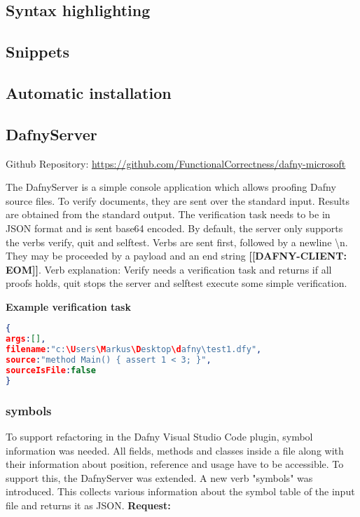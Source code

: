 \subsection{Syntax highlighting}

\subsection{Snippets}

\subsection{Automatic installation}


\subsection{DafnyServer}
Github Repository: \href{https://github.com/FunctionalCorrectness/dafny-microsoft}{https://github.com/FunctionalCorrectness/dafny-microsoft}

The DafnyServer is a simple console application which allows proofing Dafny source files. To verify documents, they are sent over the standard input. Results are obtained from the standard output. The verification task needs to be in JSON format  and is sent base64 encoded. By default, the server only supports the verbs verify, quit and selftest. Verbs are sent first, followed by a newline \textbackslash{n}. They may be proceeded by a payload and an end string \textbf{[[DAFNY-CLIENT: EOM]]}. \newline 
Verb explanation: Verify needs a verification task and returns if all proofs holds, quit stops the server and selftest execute some simple verification. \newline

\textbf{Example verification task}
\begin{lstlisting}[language=json,firstnumber=1]
{
args:[],
filename:"c:\Users\Markus\Desktop\dafny\test1.dfy",
source:"method Main() {	assert 1 < 3; }",
sourceIsFile:false
}

\end{lstlisting}

\subsubsection{symbols}
To support refactoring in the Dafny Visual Studio Code plugin, symbol information was needed. All fields, methods and classes inside a file along with their information about position, reference and usage have to be accessible. To support this, the DafnyServer was extended. A new verb "symbols" was introduced. This collects various information about the symbol table of the input file and returns it as JSON. 
\newline\newline
\textbf{Request: }

